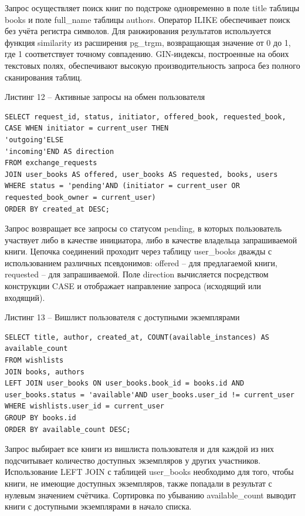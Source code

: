 \documentclass[14pt,a4paper]{extarticle}
\begin{document}
Запрос осуществляет поиск книг по подстроке одновременно в поле title
таблицы books и поле full\_name таблицы authors. Оператор ILIKE
обеспечивает поиск без учёта регистра символов. Для ранжирования
результатов используется функция similarity из расширения pg\_trgm,
возвращающая значение от 0 до 1, где 1 соответствует точному совпадению.
GIN-индексы, построенные на обоих текстовых полях, обеспечивают высокую
производительность запроса без полного сканирования таблиц.

\begin{center}
Листинг 12 -- Активные запросы на обмен пользователя
\end{center}
\begin{lstlisting}
SELECT request_id, status, initiator, offered_book, requested_book,
CASE WHEN initiator = current_user THEN
'outgoing'ELSE
'incoming'END AS direction
FROM exchange_requests
JOIN user_books AS offered, user_books AS requested, books, users
WHERE status = 'pending'AND (initiator = current_user OR requested_book_owner = current_user)
ORDER BY created_at DESC;
\end{lstlisting}

Запрос возвращает все запросы со статусом pending, в которых
пользователь участвует либо в качестве инициатора, либо в качестве
владельца запрашиваемой книги. Цепочка соединений проходит через таблицу
user\_books дважды с использованием различных псевдонимов: offered --
для предлагаемой книги, requested -- для запрашиваемой. Поле direction
вычисляется посредством конструкции CASE и отображает направление
запроса (исходящий или входящий).

\begin{center}
Листинг 13 -- Вишлист пользователя с доступными экземплярами
\end{center}
\begin{lstlisting}
SELECT title, author, created_at, COUNT(available_instances) AS
available_count
FROM wishlists
JOIN books, authors
LEFT JOIN user_books ON user_books.book_id = books.id AND user_books.status = 'available'AND user_books.user_id != current_user
WHERE wishlists.user_id = current_user
GROUP BY books.id
ORDER BY available_count DESC;
\end{lstlisting}

Запрос выбирает все книги из вишлиста пользователя и для каждой из них
подсчитывает количество доступных экземпляров у других участников.
Использование LEFT JOIN с таблицей user\_books необходимо для того,
чтобы книги, не имеющие доступных экземпляров, также попадали в
результат с нулевым значением счётчика. Сортировка по убыванию
available\_count выводит книги с доступными экземплярами в начало
списка.
\end{document}
